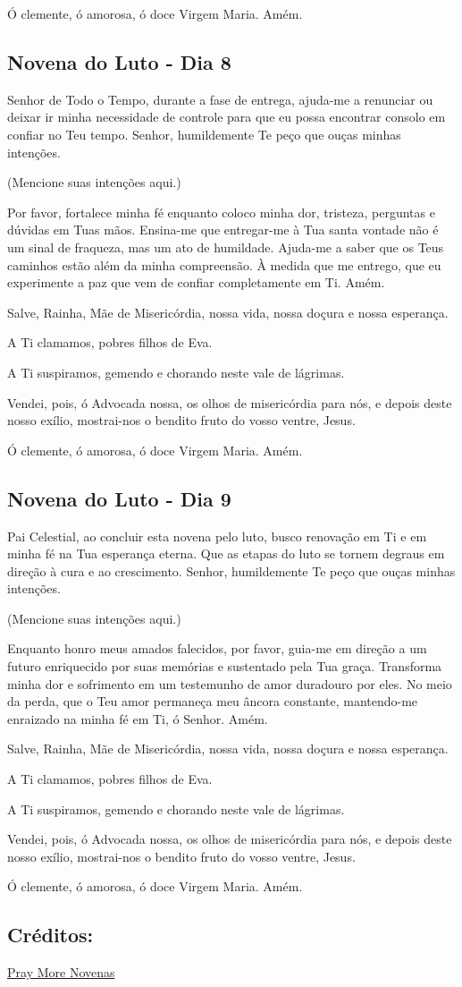 \documentclass[18pt]{article}
\begin{document}
Ó clemente, ó amorosa, ó doce Virgem Maria. Amém.

\subsection{Novena do Luto - Dia 8}
Senhor de Todo o Tempo, durante a fase de entrega, ajuda-me a renunciar ou deixar ir minha necessidade de controle para que eu possa encontrar consolo em confiar no Teu tempo. Senhor, humildemente Te peço que ouças minhas intenções.

(Mencione suas intenções aqui.)

Por favor, fortalece minha fé enquanto coloco minha dor, tristeza, perguntas e dúvidas em Tuas mãos. Ensina-me que entregar-me à Tua santa vontade não é um sinal de fraqueza, mas um ato de humildade. Ajuda-me a saber que os Teus caminhos estão além da minha compreensão. À medida que me entrego, que eu experimente a paz que vem de confiar completamente em Ti. Amém.

Salve, Rainha, Mãe de Misericórdia, nossa vida, nossa doçura e nossa esperança.

A Ti clamamos, pobres filhos de Eva.

A Ti suspiramos, gemendo e chorando neste vale de lágrimas.

Vendei, pois, ó Advocada nossa, os olhos de misericórdia para nós, e depois deste nosso exílio, mostrai-nos o bendito fruto do vosso ventre, Jesus.

Ó clemente, ó amorosa, ó doce Virgem Maria. Amém.

\subsection{Novena do Luto - Dia 9}
Pai Celestial, ao concluir esta novena pelo luto, busco renovação em Ti e em minha fé na Tua esperança eterna. Que as etapas do luto se tornem degraus em direção à cura e ao crescimento. Senhor, humildemente Te peço que ouças minhas intenções.

(Mencione suas intenções aqui.)

Enquanto honro meus amados falecidos, por favor, guia-me em direção a um futuro enriquecido por suas memórias e sustentado pela Tua graça. Transforma minha dor e sofrimento em um testemunho de amor duradouro por eles. No meio da perda, que o Teu amor permaneça meu âncora constante, mantendo-me enraizado na minha fé em Ti, ó Senhor. Amém.

Salve, Rainha, Mãe de Misericórdia, nossa vida, nossa doçura e nossa esperança.

A Ti clamamos, pobres filhos de Eva.

A Ti suspiramos, gemendo e chorando neste vale de lágrimas.

Vendei, pois, ó Advocada nossa, os olhos de misericórdia para nós, e depois deste nosso exílio, mostrai-nos o bendito fruto do vosso ventre, Jesus.

Ó clemente, ó amorosa, ó doce Virgem Maria. Amém.

\subsection*{Créditos:}
\href{https://www.praymorenovenas.com/bereavement-novena}{Pray More Novenas}
\end{document}
